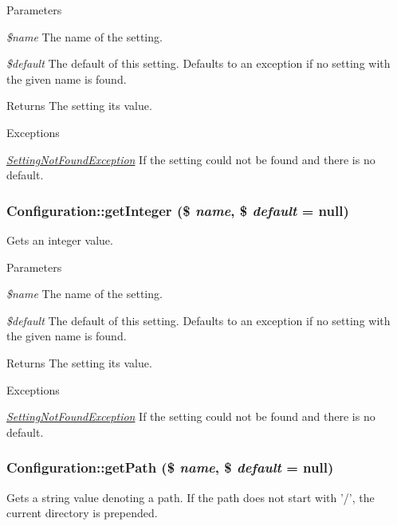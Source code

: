 \begin{DoxyParams}{Parameters}
\item[{\em \$name}]The name of the setting. \item[{\em \$default}]The default of this setting. Defaults to an exception if no setting with the given name is found.\end{DoxyParams}
\begin{DoxyReturn}{Returns}
The setting its value.
\end{DoxyReturn}

\begin{DoxyExceptions}{Exceptions}
\item[{\em \hyperlink{classSettingNotFoundException}{SettingNotFoundException}}]If the setting could not be found and there is no default. \end{DoxyExceptions}
\hypertarget{classConfiguration_a7aba0859f79226be3b942e11a1d33738}{
\subsubsection[{getInteger}]{\setlength{\rightskip}{0pt plus 5cm}Configuration::getInteger (\$ {\em name}, \/  \$ {\em default} = {\ttfamily null})}}
\label{classConfiguration_a7aba0859f79226be3b942e11a1d33738}
Gets an integer value.


\begin{DoxyParams}{Parameters}
\item[{\em \$name}]The name of the setting. \item[{\em \$default}]The default of this setting. Defaults to an exception if no setting with the given name is found.\end{DoxyParams}
\begin{DoxyReturn}{Returns}
The setting its value.
\end{DoxyReturn}

\begin{DoxyExceptions}{Exceptions}
\item[{\em \hyperlink{classSettingNotFoundException}{SettingNotFoundException}}]If the setting could not be found and there is no default. \end{DoxyExceptions}
\hypertarget{classConfiguration_a71e55f600649d58321c039cbb829ea09}{
\subsubsection[{getPath}]{\setlength{\rightskip}{0pt plus 5cm}Configuration::getPath (\$ {\em name}, \/  \$ {\em default} = {\ttfamily null})}}
\label{classConfiguration_a71e55f600649d58321c039cbb829ea09}
Gets a string value denoting a path. If the path does not start with '/', the current directory is prepended.

